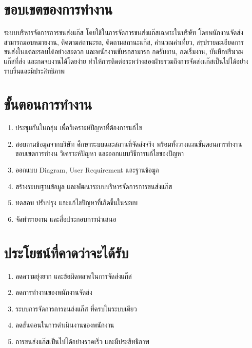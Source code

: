 \section{ขอบเขตของการทำงาน}
ระบบบริหารจัดการการขนส่งแก๊ส โดยใช้ในการจัดการขนส่งแก๊สเฉพาะในบริษัท โดยพนักงานจัดส่งสามารถมอบหมายงาน, ติดตามสถานะรถ, ติดถามสถานะแก๊ส, คำนวณค่าเที่ยว, สรุปรายละเอียดการขนส่งในแต่ละรอบได้อย่างสะดวก และพนักงานขับรถสามารถ กดรับงาน, กดเริ่มงาน, บันทึกปริมาณแก๊สที่ส่ง และกดจบงานได้โดยง่าย ทำให้การติดต่อระหว่างสองฝ่ายรวมถึงการจัดส่งแก๊สเป็นไปได้อย่างราบรื่นและมีประสิทธิภาพ

\section{ขั้นตอนการทำงาน}

\begin{enumerate}
    \item ประชุมกันในกลุ่ม เพื่อวิเคราะห์ปัญหาที่ต้องการแก้ไข
    \item สอบถามข้อมูลจากบริษัท ศึกษาระบบและสถานที่จัดส่งจริง พร้อมทั้งวางแผนขั้นตอนการทำงาน ขอบเขตการทำงน วิเคราะห์ปัญหา และออกแบบวิธีการแก้ไขของปัญหา
    \item ออกแบบ Diagram, User Requirement และฐานข้อมูล
    \item สร้างระบบฐานข้อมูล และพัฒนาระบบบริหารจัดการการขนส่งแก๊ส
    \item ทดสอบ ปรับปรุง และแก้ไขปัญหาที่เกิดขึ้นในระบบ
    \item จัดทำรายงาน และสื่อประกอบการนำเสนอ
\end{enumerate}

\section{ประโยชน์ที่คาดว่าจะได้รับ}
\begin{enumerate}
    \item ลดความยุ่งยาก และข้อผิดพลาดในการจัดส่งแก๊ส
    \item ลดการทำงานของพนักงานจัดส่ง
    \item ระบบการจัดการการขนส่งแก๊ส ที่ครบในระบบเดียว
    \item ลดขั้นตอนในการดำเนินงานของพนักงาน
    \item การขนส่งแก๊สเป็นไปได้อย่างรวดเร็ว และมีประสิทธิภาพ
\end{enumerate}

